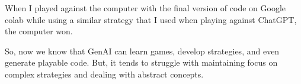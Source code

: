 \documentclass{article}
\begin{document}
When I played against the computer with the final version of code on Google colab while using a similar strategy that I used when playing against ChatGPT, the computer won.\newline

So, now we know that GenAI can learn games, develop strategies, and even generate playable code. But, it tends to struggle with maintaining focus on complex strategies and dealing with abstract concepts. \newline
\end{document}
